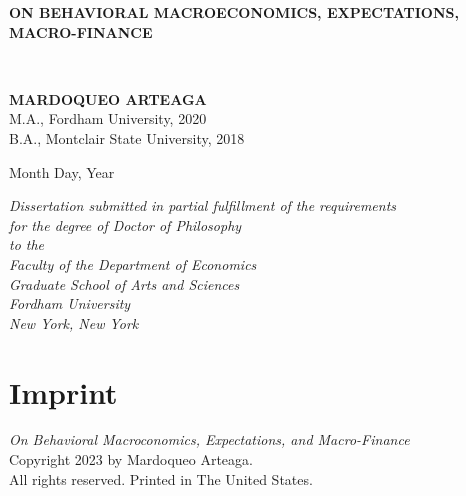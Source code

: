 \begin{titlepage}
\begin{center}

\mbox{} \vspace{0.75in}

\begin{Large} {\bf \textcolor{persian}{ON BEHAVIORAL MACROECONOMICS, EXPECTATIONS,} { 
\raisebox{.2ex}{\small AND}
} \textcolor{persian}{MACRO-FINANCE}} \\ \end{Large}
\bigskip \bigskip \bigskip

{\Large  \   } 

\bigskip \bigskip \bigskip

\textbf{MARDOQUEO ARTEAGA} \\
M.A., Fordham University, 2020\\
B.A., Montclair State University, 2018 

\bigskip \bigskip 

Month Day, Year

\bigskip \bigskip

\singlespacing
{\small \emph{Dissertation submitted in partial fulfillment of the requirements\\ for the degree of Doctor of Philosophy\\[1em]
to the\\[1em]
Faculty of the Department of Economics\\
Graduate School of Arts and Sciences\\ Fordham University\\ New York, New York} }
\doublespacing
\vfill


\end{center}

\section*{Imprint}

\textit{On Behavioral Macroconomics, Expectations, and Macro-Finance}\\
Copyright \textcopyright{} 2023 by Mardoqueo Arteaga.\\
All rights reserved. Printed in The United States.\\



\end{titlepage}
